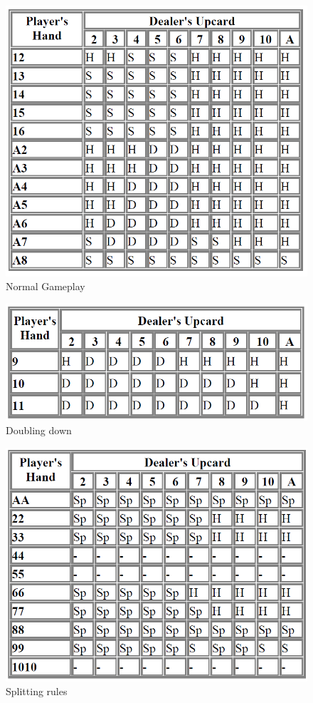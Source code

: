 \documentclass[conference]{IEEEtran}
\begin{document}
\begin{figure}[H]
	\includegraphics[width=\linewidth]{img/ThorpeNormal}
  	\caption{Normal Gameplay}
  	\label{fig:normalgameplaying}
\end{figure}
\begin{figure}[H]
	\includegraphics[width=\linewidth]{img/doubleDown}
  	\caption{Doubling down}
  	\label{fig:doublingDown}
\end{figure}
\begin{figure}[H]
	\includegraphics[width=\linewidth]{img/SplittingRules}
  	\caption{Splitting rules}
  	\label{fig:splittingRules}
\end{figure}
\end{document}
